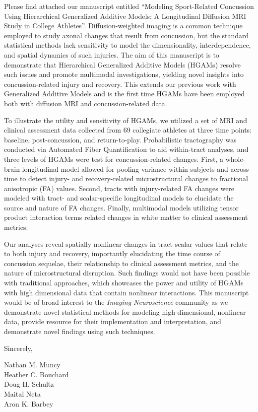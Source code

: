 \documentclass{article}
\begin{document}
Please find attached our manuscript entitled ``Modeling Sport-Related Concussion Using Hierarchical Generalized Additive Models: A Longitudinal Diffusion MRI Study in College Athletes''. Diffusion-weighted imaging is a common technique employed to study axonal changes that result from concussion, but the standard statistical methods lack sensitivity to model the dimensionality, interdependence, and spatial dynamics of such injuries. The aim of this manuscript is to demonstrate that Hierarchical Generalized Additive Models (HGAMs) resolve such issues and promote multimodal investigations, yielding novel insights into concussion-related injury and recovery. This extends our previous work with Generalized Additive Models and is the first time HGAMs have been employed both with diffusion MRI and concussion-related data.

To illustrate the utility and sensitivity of HGAMs, we utilized a set of MRI and clinical assessment data collected from 69 collegiate athletes at three time points: baseline, post-concussion, and return-to-play. Probabilistic tractography was conducted via Automated Fiber Quantification to aid within-tract analyses, and three levels of HGAMs were test for concussion-related changes. First, a whole-brain longitudinal model allowed for pooling variance within subjects and across time to detect injury- and recovery-related microstructural changes to fractional anisotropic (FA) values. Second, tracts with injury-related FA changes were modeled with tract- and scalar-specific longitudinal models to elucidate the source and nature of FA changes. Finally, multimodal models utilizing tensor product interaction terms related changes in white matter to clinical assessment metrics.

Our analyses reveal spatially nonlinear changes in tract scalar values that relate to both injury and recovery, importantly elucidating the time course of concussion sequelae, their relationship to clinical assessment metrics, and the nature of microstructural disruption. Such findings would not have been possible with traditional approaches, which showcases the power and utility of HGAMs with high dimensional data that contain nonlinear interactions. This manuscript would be of broad interest to the \textit{Imaging Neuroscience} community as we demonstrate novel statistical methods for modeling high-dimensional, nonlinear data, provide resource for their implementation and interpretation, and demonstrate novel findings using such techniques.

\par\vspace{2ex}
Sincerely,

\bigskip\bigskip

Nathan M. Muncy\\
Heather C. Bouchard\\
Doug H. Schultz\\
Maital Neta\\
Aron K. Barbey
\end{document}
